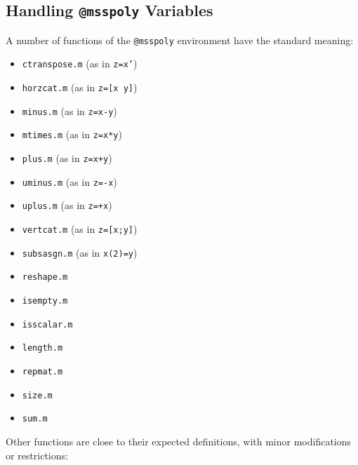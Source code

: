 \documentclass[12pt]{article}
\begin{document}
\subsection{Handling {\tt @msspoly} Variables}
A number of functions of the {\tt @msspoly} environment have the
standard meaning:
\begin{itemize}
\item {\tt ctranspose.m} (as in {\tt z=x'})
\item {\tt horzcat.m} (as in {\tt z=[x y]})
\item {\tt minus.m} (as in {\tt z=x-y})
\item {\tt mtimes.m} (as in {\tt z=x*y})
\item {\tt plus.m} (as in {\tt z=x+y})
\item {\tt uminus.m} (as in {\tt z=-x})
\item {\tt uplus.m} (as in {\tt z=+x})
\item {\tt vertcat.m} (as in {\tt z=[x;y]})
\item {\tt subsasgn.m} (as in {\tt x(2)=y})
\item {\tt reshape.m}
\item {\tt isempty.m}
\item {\tt isscalar.m}
\item {\tt length.m}
\item {\tt repmat.m}
\item {\tt size.m}
\item {\tt sum.m}
\end{itemize}
Other functions are close to their expected definitions, with minor
modifications or restrictions:
\end{document}
